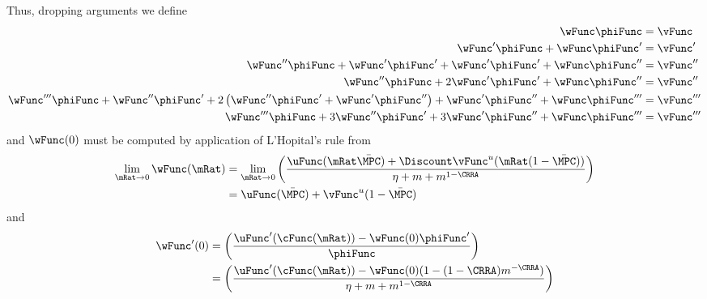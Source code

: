 \documentclass{\handout}
\begin{document}
\begin{CDCPrivate}
Thus, dropping arguments we define 
\begin{equation}\begin{gathered}\begin{aligned}
    \wFunc \phiFunc & =  \vFunc
\\  \wFunc^{\prime} \phiFunc + \wFunc \phiFunc^{\prime} & =  \vFunc^{\prime}
\\  \wFunc^{\prime\prime} \phiFunc + \wFunc^{\prime} \phiFunc^{\prime} + \wFunc^{\prime} \phiFunc^{\prime} + \wFunc \phiFunc^{\prime\prime} & =  \vFunc^{\prime\prime}
\\  \wFunc^{\prime\prime} \phiFunc + 2 \wFunc^{\prime} \phiFunc^{\prime}+ \wFunc \phiFunc^{\prime\prime} & =  \vFunc^{\prime\prime}
\\  \wFunc^{\prime\prime\prime} \phiFunc + \wFunc^{\prime\prime} \phiFunc^{\prime} + 2 \left(\wFunc^{\prime\prime} \phiFunc^{\prime} + \wFunc^{\prime} \phiFunc^{\prime\prime}\right)+ \wFunc^{\prime} \phiFunc^{\prime\prime}+ \wFunc \phiFunc^{\prime\prime\prime} & =  \vFunc^{\prime\prime\prime}
\\  \wFunc^{\prime\prime\prime} \phiFunc + 3 \wFunc^{\prime\prime} \phiFunc^{\prime} + 3 \wFunc^{\prime} \phiFunc^{\prime\prime}+ \wFunc \phiFunc^{\prime\prime\prime} & =  \vFunc^{\prime\prime\prime}
\end{aligned}\end{gathered}\end{equation}
and $\wFunc(0)$ must be computed by application of L'Hopital's rule from
\begin{equation}\begin{gathered}\begin{aligned}
  \lim_{\mRat \rightarrow 0} \wFunc(\mRat) & =  \lim_{\mRat \rightarrow 0} \left(\frac{\uFunc(\mRat \bar{\MPC}) + \Discount \vFunc^{u}(\mRat (1-\bar{\MPC}))}{\eta + m + m^{1-\CRRA}}\right)
\\ & =  \uFunc(\bar{\MPC})+\vFunc^{u}(1-\bar{\MPC})
\end{aligned}\end{gathered}\end{equation}
and 
\begin{equation}\begin{gathered}\begin{aligned}
 \wFunc^{\prime}(0) & =  \left(\frac{\uFunc^{\prime}(\cFunc(\mRat)) - \wFunc(0) \phiFunc^{\prime}}{\phiFunc}\right)
\\  & =  \left(\frac{\uFunc^{\prime}(\cFunc(\mRat)) - \wFunc(0) (1-(1-\CRRA)m^{-\CRRA})}{\eta+m+m^{1-\CRRA}}\right)
\end{aligned}\end{gathered}\end{equation}


\end{CDCPrivate}
\end{document}

